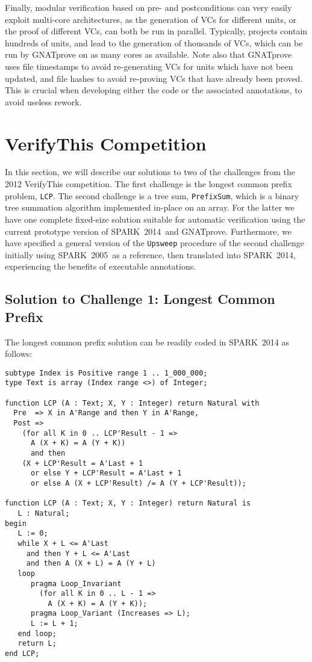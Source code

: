 \documentclass[sttt,draft]{svjour}
\newcommand{\gnatprove}{GNATprove\xspace}
\newcommand{\oldspark}{SPARK~2005\xspace}
\newcommand{\newspark}{SPARK~2014\xspace}
\begin{document}
Finally, modular verification based on pre- and postconditions can very easily
exploit multi-core architectures, as the generation of VCs for different units,
or the proof of different VCs, can both be run in parallel. Typically, projects
contain hundreds of units, and lead to the generation of thousands of VCs,
which can be run by \gnatprove on as many cores as available. Note also that
\gnatprove uses file timestamps to avoid re-generating VCs for units which have
not been updated, and file hashes to avoid re-proving VCs that have already
been proved. This is crucial when developing either the code or the associated
annotations, to avoid useless rework.

\section{VerifyThis Competition}
\label{verifythis}
In this section, we will describe our solutions to two of the
challenges from the 2012 VerifyThis competition. The first challenge
is the longest common prefix problem, \verb|LCP|. The second challenge
is a tree sum, \verb|PrefixSum|, which is a binary tree summation
algorithm implemented in-place on an array. For the latter we have one
complete fixed-size solution suitable for automatic verification using
the current prototype version of \newspark\ and
\gnatprove. Furthermore, we have specified a general version of the
\verb|Upsweep| procedure of the second challenge initially using
\oldspark\ as a reference, then translated into \newspark,
experiencing the benefits of executable annotations.
\subsection{Solution to Challenge 1: Longest Common Prefix}

The longest common prefix solution can be readily coded in \newspark as follows:

\begin{footnotesize}
\begin{verbatim}
subtype Index is Positive range 1 .. 1_000_000;
type Text is array (Index range <>) of Integer;

function LCP (A : Text; X, Y : Integer) return Natural with
  Pre  => X in A'Range and then Y in A'Range,
  Post =>
    (for all K in 0 .. LCP'Result - 1 =>
      A (X + K) = A (Y + K))
      and then
    (X + LCP'Result = A'Last + 1
      or else Y + LCP'Result = A'Last + 1
      or else A (X + LCP'Result) /= A (Y + LCP'Result));

function LCP (A : Text; X, Y : Integer) return Natural is
   L : Natural;
begin
   L := 0;
   while X + L <= A'Last
     and then Y + L <= A'Last
     and then A (X + L) = A (Y + L)
   loop
      pragma Loop_Invariant
        (for all K in 0 .. L - 1 =>
          A (X + K) = A (Y + K));
      pragma Loop_Variant (Increases => L);
      L := L + 1;
   end loop;
   return L;
end LCP;
\end{verbatim}
\end{footnotesize}
\end{document}

